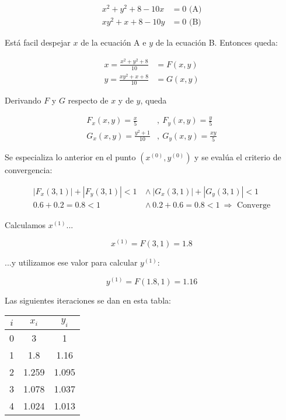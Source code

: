 \documentclass{article}
\begin{document}
\begin{align*}
    x^2 + y^2 + 8 - 10x &= 0\text{ (A)}\\
    xy^2 + x + 8 - 10y &= 0\text{ (B)}
\end{align*}

Está facil despejar $x$ de la ecuación A e $y$ de la ecuación B. Entonces queda:

\begin{align*}
    x = \frac{x^2+y^2+8}{10} &= F(x,y) \\
    y = \frac{xy^2+x+8}{10} &= G(x,y)
\end{align*}

Derivando $F$ y $G$ respecto de $x$ y de $y$, queda

\begin{align*}
    F_x(x,y) = \frac{x}{5}&,\ F_y(x,y) = \frac{y}{5} \\
    G_x(x,y) = \frac{y^2+1}{10}&,\ G_y(x,y) = \frac{xy}{5}
\end{align*}

Se especializa lo anterior en el punto $(x^{(0)}, y^{(0)})$ y se evalúa el 
criterio de convergencia:

\begin{align*}
    |F_x(3,1)| + |F_y(3,1)| < 1\ &\land\ |G_x(3,1)| + |G_y(3,1)| < 1 \\
    0.6 + 0.2 = 0.8 < 1\ &\land\ 0.2 + 0.6 = 0.8 < 1\ \Longrightarrow\text{ Converge}
\end{align*}

Calculamos $x^{(1)}$...

\begin{equation*}
    x^{(1)} = F(3,1) = 1.8
\end{equation*}

...y utilizamos ese valor para calcular $y^{(1)}$:

\begin{equation*}
    y^{(1)} = F(1.8,1) = 1.16
\end{equation*}

Las siguientes iteraciones se dan en esta tabla:

\begin{table}[h]
\centering
\begin{tabular}{ccc}
$i$ & $x_i$  & $y_i$  \\\hline
  0 & 3      & 1      \\
  1 & 1.8    & 1.16   \\
  2 & 1.259  & 1.095  \\
  3 & 1.078  & 1.037  \\
  4 & 1.024  & 1.013
\end{tabular}
\end{table}
\end{document}
